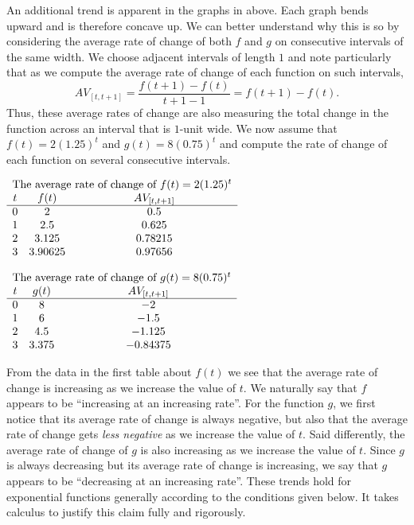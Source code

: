 \documentclass[nooutcomes]{ximera}
\begin{document}
An additional trend is apparent in the graphs in above.  Each graph bends upward and is therefore concave up.  We can better understand why this is so by considering the average rate of change of both \(f\) and \(g\) on consecutive intervals of the same width.  We choose adjacent intervals of length \(1\) and note particularly that as we compute the average rate of change of each function on such intervals,%
\begin{equation*}
AV_{[t,t+1]} = \frac{f(t+1) - f(t)}{t+1-1} = f(t+1) - f(t)\text{.}
\end{equation*}
Thus, these average rates of change are also measuring the total change in the function across an interval that is \(1\)-unit wide. We now assume that \(f(t) = 2 (1.25)^t\) and \(g(t) = 8(0.75)^t\) and compute the rate of change of each function on several consecutive intervals.


\begin{center}
\(
{\begin{array}{ccc}
\multicolumn{3}{c}{\text{The average rate of change of } f(t) = 2(1.25)^t}\\
t&f(t)&AV_{[t,t+1]}\\
\hline
0&2&0.5\\
1&2.5&0.625\\
2&3.125&0.78215\\
3&3.90625&0.97656
\end{array}}%
\)
\end{center}
\begin{center}
\(
{\begin{array}{ccc}
\multicolumn{3}{c}{\text{The average rate of change of } g(t) = 8(0.75)^t}\\
t&g(t)&AV_{[t,t+1]}\\
\hline
0&8&-2\\
1&6&-1.5\\
2&4.5&-1.125\\
3&3.375&-0.84375
\end{array}}%
\)
\end{center}

From the data in the first table about $f(t)$ we see that the average rate of change is increasing as we increase the value of \(t\).  We naturally say that \(f\) appears to be ``increasing at an increasing rate''.  For the function \(g\), we first notice that its average rate of change is always negative, but also that the average rate of change gets \emph{less negative} as we increase the value of \(t\). Said differently, the average rate of change of \(g\) is also increasing as we increase the value of \(t\).  Since \(g\) is always decreasing but its average rate of change is increasing, we say that \(g\) appears to be ``decreasing at an increasing rate''.  These trends hold for exponential functions generally according to the conditions given below.  It takes calculus to justify this claim fully and rigorously. 
\end{document}

